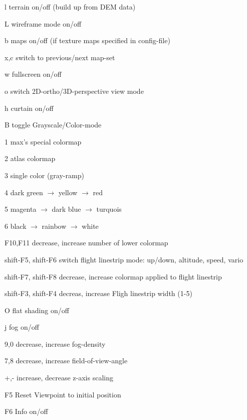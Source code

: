 \begin{keys}
\item[l]        terrain on/off (build up from DEM data)
\item[L]        wireframe mode on/off
\item[b]        maps on/off (if texture maps specified in config-file)
\item[x,c] 	switch to previous/next map-set
\item[w]        fullscreen on/off
\item[o]        switch 2D-ortho/3D-perspective view mode
\item[h]        curtain on/off
\item[B]        toggle Grayscale/Color-mode

\item[1]  max's special colormap
\item[2]  atlas colormap
\item[3]  single color (gray-ramp)
\item[4]  dark green $\rightarrow$ yellow $\rightarrow$ red
\item[5]  magenta $\rightarrow$ dark blue $\rightarrow$ turquois
\item[6]  black $\rightarrow$ rainbow $\rightarrow$ white

\item[F10,F11] decrease, increase number of lower colormap

\item[shift-F5, shift-F6]
        switch flight linestrip mode: up/down, altitude, speed, vario

\item[shift-F7, shift-F8]
        decrease, increase colormap applied to flight linestrip

\item[shift-F3, shift-F4]
        decreas, increase Fligh linestrip width (1-5)



\item[O]        flat shading on/off
\item[j]        fog on/off
\item[9,0]      decrease, increase fog-density
\item[7,8]      decrease, increase field-of-view-angle

\item[+,-]      increase, decrease z-axis scaling

\item[F5]       Reset Viewpoint to initial position
\item[F6]       Info on/off


\end{keys}
